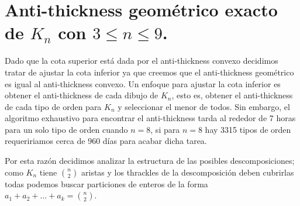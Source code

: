 \section{Anti-thickness geométrico exacto de $K_n$ con $3\leq n \leq 9$.}
Dado que la cota superior está dada por el anti-thickness convexo decidimos tratar
de ajustar la cota inferior ya que creemos que el anti-thickness geométrico es igual
al anti-thickness convexo. Un enfoque para ajustar la cota inferior es obtener el
anti-thickness de cada dibujo de $K_n$, esto es, obtener el anti-thickness de cada
tipo de orden para $K_n$ y seleccionar el menor de todos. Sin embargo, el algoritmo
exhaustivo para encontrar el anti-thickness tarda al rededor de 7 horas para un solo
tipo de orden cuando $n=8$, si para $n=8$ hay 3315 tipos de orden requeririamos
cerca de 960 días para acabar dicha tarea.

Por esta razón decidimos analizar la estructura de las posibles descomposiciones;
como $K_n$ tiene $\binom{n}{2}$ aristas y los thrackles de la descomposición deben
cubrirlas todas podemos buscar particiones de enteros de la forma $a_1 + a_2 + \dots +
a_k = \binom{n}{2}$.

